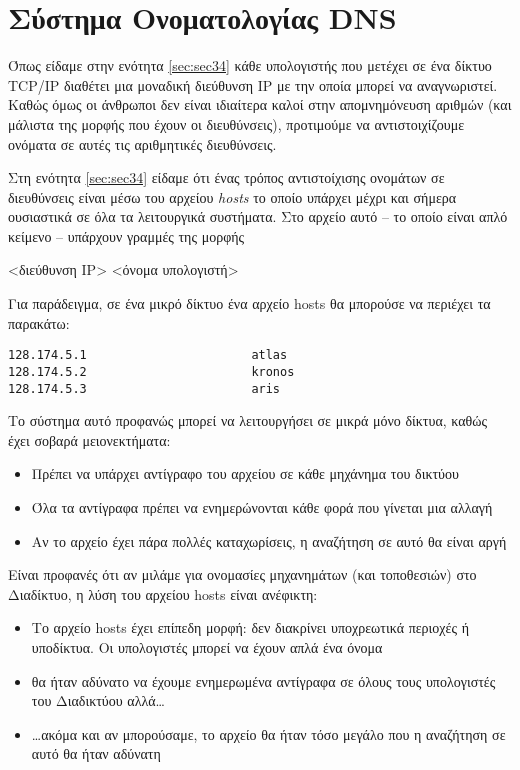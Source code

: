 %
%
\section{Σύστημα Ονοματολογίας DNS}
\label{sec:sec61}

Όπως είδαμε στην ενότητα \ref{sec:sec34} κάθε υπολογιστής που μετέχει σε ένα δίκτυο TCP/IP διαθέτει μια μοναδική διεύθυνση IP με την οποία μπορεί να αναγνωριστεί. Καθώς όμως οι άνθρωποι δεν είναι ιδιαίτερα καλοί στην απομνημόνευση αριθμών (και μάλιστα της μορφής που έχουν οι διευθύνσεις), προτιμούμε να αντιστοιχίζουμε ονόματα σε αυτές τις αριθμητικές διευθύνσεις. 

Στη ενότητα \ref{sec:sec34} είδαμε ότι ένας τρόπος αντιστοίχισης ονομάτων σε διευθύνσεις είναι μέσω του αρχείου \emph{hosts} το οποίο υπάρχει μέχρι και σήμερα ουσιαστικά σε όλα τα λειτουργικά συστήματα. Στο αρχείο αυτό -- το οποίο είναι απλό κείμενο -- υπάρχουν γραμμές της μορφής 

\begin{center}
<διεύθυνση IP> \hspace{20mm} <όνομα υπολογιστή>
\end{center}

Για παράδειγμα, σε ένα μικρό δίκτυο ένα αρχείο hosts θα μπορούσε να περιέχει τα παρακάτω:

\begin{verbatim}
128.174.5.1                       atlas
128.174.5.2                       kronos
128.174.5.3                       aris
\end{verbatim}

Το σύστημα αυτό προφανώς μπορεί να λειτουργήσει σε μικρά μόνο δίκτυα, καθώς έχει σοβαρά μειονεκτήματα:

\begin{itemize}
\item Πρέπει να υπάρχει αντίγραφο του αρχείου σε κάθε μηχάνημα του δικτύου
\item Όλα τα αντίγραφα πρέπει να ενημερώνονται κάθε φορά που γίνεται μια αλλαγή
\item Αν το αρχείο έχει πάρα πολλές καταχωρίσεις, η αναζήτηση σε αυτό θα είναι αργή
\end{itemize}

Είναι προφανές ότι αν μιλάμε για ονομασίες μηχανημάτων (και τοποθεσιών) στο Διαδίκτυο, η λύση του αρχείου hosts είναι ανέφικτη:

\begin{itemize}
\item Το αρχείο hosts έχει επίπεδη μορφή: δεν διακρίνει υποχρεωτικά περιοχές ή υποδίκτυα. Οι υπολογιστές μπορεί να έχουν απλά ένα όνομα
\item θα ήταν αδύνατο να έχουμε ενημερωμένα αντίγραφα σε όλους τους υπολογιστές του Διαδικτύου αλλά\ldots
\item \ldots{}ακόμα και αν μπορούσαμε, το αρχείο θα ήταν τόσο μεγάλο που η αναζήτηση σε αυτό θα ήταν αδύνατη
\end{itemize}

